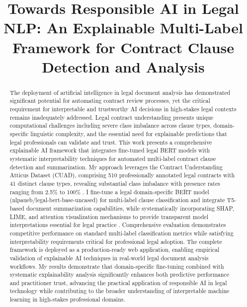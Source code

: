 \documentclass[conference]{IEEEtran}
\begin{document}
\title{Towards Responsible AI in Legal NLP: An Explainable Multi-Label Framework for Contract Clause Detection and Analysis}

\author{
}

\maketitle

\thispagestyle{plain}
\pagestyle{plain}

\begin{abstract}
The deployment of artificial intelligence in legal document analysis has demonstrated significant potential for automating contract review processes, yet the critical requirement for interpretable and trustworthy AI decisions in high-stakes legal contexts remains inadequately addressed. Legal contract understanding presents unique computational challenges including severe class imbalance across clause types, domain-specific linguistic complexity, and the essential need for explainable predictions that legal professionals can validate and trust. This work presents a comprehensive explainable AI framework that integrates fine-tuned legal BERT models with systematic interpretability techniques for automated multi-label contract clause detection and summarization. My approach leverages the Contract Understanding Atticus Dataset (CUAD), comprising 510 professionally annotated legal contracts with 41 distinct clause types, revealing substantial class imbalance with presence rates ranging from 2.5\% to 100\% \cite{hendrycks2021cuad}. I fine-tune a legal domain-specific BERT model (nlpaueb/legal-bert-base-uncased) for multi-label clause classification \cite{chalkidis2020legal} and integrate T5-based document summarization capabilities, while systematically incorporating SHAP, LIME, and attention visualization mechanisms to provide transparent model interpretations essential for legal practice \cite{lundberg2017unified}. Comprehensive evaluation demonstrates competitive performance on standard multi-label classification metrics while satisfying interpretability requirements critical for professional legal adoption. The complete framework is deployed as a production-ready web application, enabling empirical validation of explainable AI techniques in real-world legal document analysis workflows. My results demonstrate that domain-specific fine-tuning combined with systematic explainability analysis significantly enhances both predictive performance and practitioner trust, advancing the practical application of responsible AI in legal technology while contributing to the broader understanding of interpretable machine learning in high-stakes professional domains.
\end{abstract}
\end{document}
